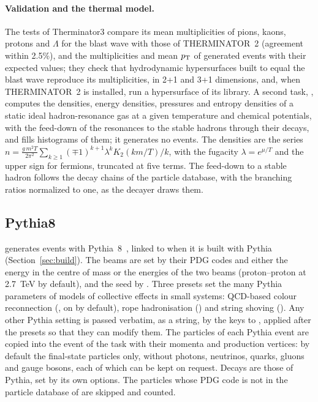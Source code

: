\paragraph{Validation and the thermal model.}
The tests of Therminator3 compare its mean multiplicities of pions, kaons, protons and $\Lambda$ for the blast wave
with those of THERMINATOR~2 (agreement within 2.5\%), and the multiplicities and mean $p_{\mathrm{T}}$ of generated events
with their expected values; they check that hydrodynamic hypersurfaces built to equal the blast wave reproduce its
multiplicities, in 2+1 and 3+1 dimensions, and, when THERMINATOR~2 is installed, run a hypersurface of its library.
A second task, , computes the densities, energy densities, pressures and entropy densities of a
static ideal hadron-resonance gas at a given temperature and chemical potentials, with the feed-down of the
resonances to the stable hadrons through their decays, and fills histograms of them; it generates no events.
The densities are the series
$n = \frac{g\,m^2T}{2\pi^2}\sum_{k\ge1}(\mp1)^{k+1}\lambda^k K_2(km/T)/k$, with the fugacity $\lambda = e^{\mu/T}$ and the
upper sign for fermions, truncated at five terms. The feed-down to a stable hadron follows the decay chains of the
particle database, with the branching ratios normalized to one, as the decayer draws them.

\subsection{Pythia8}
\label{sec:pythia}

 generates events with Pythia~8~\cite{Bierlich:2022pfr}, linked to \Datum{} when it is built
with Pythia (Section~\ref{sec:build}). The beams are set by their PDG codes and either the energy in the centre of mass
or the energies of the two beams (proton--proton at 2.7~TeV by default), and the seed by . Three
presets set the many Pythia parameters of models of collective effects in small systems: QCD-based colour
reconnection (, on by default), rope hadronisation () and string shoving
(). Any other Pythia setting is passed verbatim, as a string, by the keys  to
, applied after the presets so that they can modify them. The particles of each Pythia event are
copied into the event of the task with their momenta and production vertices: by default the final-state particles
only, without photons, neutrinos, quarks, gluons and gauge bosons, each of which can be kept on request. Decays are
those of Pythia, set by its own options. The particles whose PDG code is not in the particle database of \Datum{} are
skipped and counted.

